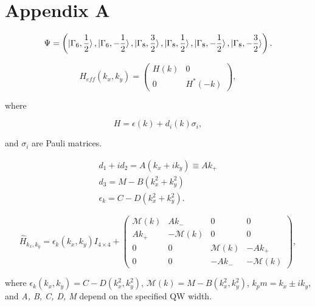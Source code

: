 \documentclass[titlepage,a4paper]{book}
\begin{document}
\appendix
\chapter{Appendix A}

\begin{equation}
\label{1}
\Psi = \left( \ket{\Gamma_6, \frac{1}{2}}, \ket{\Gamma_6, -\frac{1}{2}}, \ket{\Gamma_8, \frac{3}{2}}, \ket{\Gamma_8, \frac{1}{2}}, \ket{\Gamma_8, -\frac{1}{2}}, \ket{\Gamma_8, -\frac{3}{2}}  \right).
\end{equation}


\begin{equation}
\label{2}
H_{eff}(k_x, k_y) =  \left( \begin{array}{cc}
H(k) & 0 \\
0 & H^*(-k) \end{array} \right),
\end{equation}

where 

\begin{equation}
\label{3}
H = \epsilon (k) + d_i (k) \sigma_i,
\end{equation}

and $\sigma_i$ are Pauli matrices.

\begin{equation}
\begin{aligned}
\label{4}
d_1 + id_2 = A(k_x + ik_y) \equiv Ak_+ \\
d_3 = M - B(k_x^2 + k_y^2) \\
\epsilon_k = C - D(k_x^2 + k_y^2).
\end{aligned}
\end{equation}

\begin{equation}
\label{asd}
\hat{H}_{k_x, k_y} = \epsilon_k(k_x, k_y) I_{4 \times 4} + \left( \begin{array}{cccc}
\mathcal{M}(k) & Ak_- & 0 & 0 \\
Ak_+ & -\mathcal{M}(k) & 0 & 0 \\
0 & 0 & \mathcal{M}(k) & -Ak_+ \\
0 & 0 & -Ak_- & -\mathcal{M}(k) \end{array} \right),
\end{equation}

where $\epsilon_k(k_x, k_y) = C - D(k_x^2, k_y^2)$, $\mathcal{M}(k) = M - B(k_x^2, k_y^2)$, $k_pm = k_x \pm ik_y$, and \textit{A, B, C, D, M} depend on the specified QW width.

\end{document}
